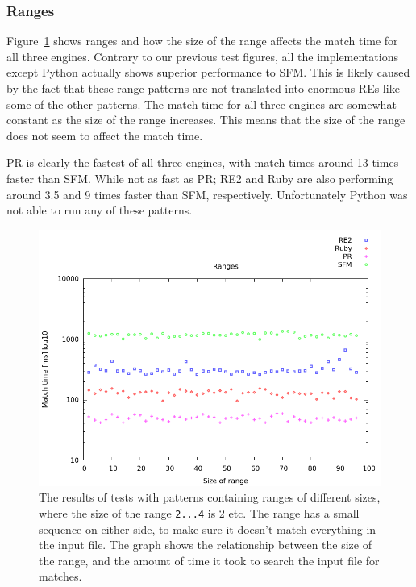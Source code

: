 \documentclass[12pt]{article}
\theoremstyle{definition}
\begin{document}
\subsubsection{Ranges}

Figure~\ref{graph:cases:ranges} shows ranges and how the size of the range affects the match time for all three engines. Contrary to our previous test figures, all the implementations except Python actually shows superior performance to SFM. This is likely caused by the fact that these range patterns are not translated into enormous REs like some of the other patterns. The match time for all three engines are somewhat constant as the size of the range increases. This means that the size of the range does not seem to affect the match time.

PR is clearly the fastest of all three engines, with match times around 13 times faster than SFM. While not as fast as PR; RE2 and Ruby are also performing around 3.5 and 9 times faster than SFM, respectively. Unfortunately Python was not able to run any of these patterns.

\begin{figure}[H]
	\begin{center}
		\includegraphics[scale=0.55]{graphs/ranges.png}	
	\end{center}
	\caption{The results of tests with patterns containing ranges of different sizes, where the size of the range \texttt{2...4} is 2 etc. The range has a small sequence on either side, to make sure it doesn't match everything in the input file. The graph shows the relationship between the size of the range, and the amount of time it took to search the input file for matches.}
	\label{graph:cases:ranges}
\end{figure}
\end{document}

